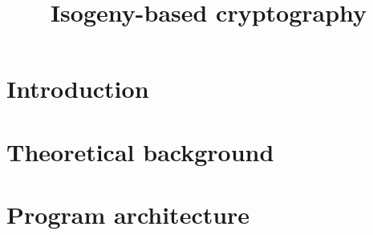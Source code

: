 \documentclass[12pt]{article}
\title{Isogeny-based cryptography}
\author{}
\date{}
\begin{document}
\maketitle
\renewcommand{\contentsname}{Table of content}
\tableofcontents
\newpage

%

\section{Introduction}


\section{Theoretical background}


\section{Program architecture}


%
\end{document}
